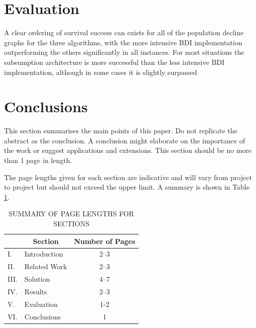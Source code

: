 \documentclass[12pt,a4paper]{article}
\begin{document}
\section{Evaluation}
A clear ordering of survival success can exists for all of the population decline graphs for the three algorithms, with the more intensive BDI implementation outperforming the others significantly in all instances. For most situations the subsumption architecture is more successful than the less intensive BDI implementation, although in some cases it is slightly surpassed 

\section{Conclusions}

This section summarises the main points of this paper.  Do not replicate the abstract as the conclusion.  A conclusion might elaborate on the importance of the work or suggest applications and extensions.  This section should be no more than 1 page in length.

The page lengths given for each section are indicative and will vary from project to project but should not exceed the upper limit.  A summary is shown in Table \ref{summary}.

\begin{table}[htb]
\centering
\caption{SUMMARY OF PAGE LENGTHS FOR SECTIONS}
\vspace*{6pt}
\label{summary}
\begin{tabular}{|ll|c|} \hline
& \multicolumn{1}{c|}{\bf Section} & {\bf Number of Pages} \\ \hline
I. & Introduction & 2--3 \\ \hline
II. & Related Work & 2--3 \\ \hline
III. & Solution & 4--7 \\ \hline
IV. & Results & 2--3 \\ \hline
V. & Evaluation & 1-2 \\ \hline
VI. & Conclusions & 1 \\ \hline
\end{tabular}
\end{table}



\end{document}
